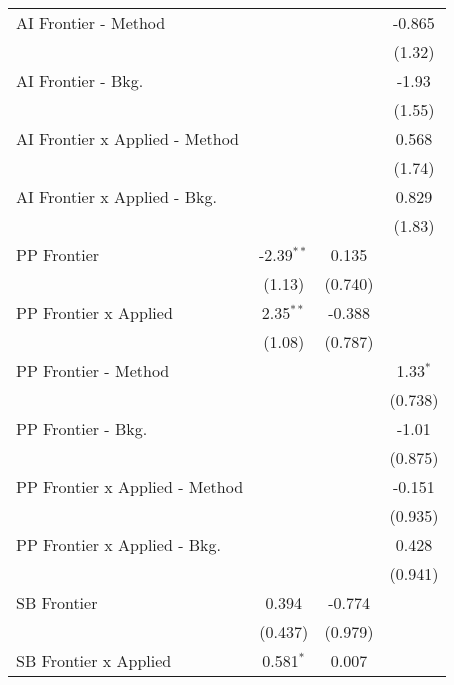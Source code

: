 \begin{tabular}{lccc}
   AI Frontier - Method           &              &             & -0.865\\   
                                  &              &             & (1.32)\\   
   AI Frontier - Bkg.             &              &             & -1.93\\   
                                  &              &             & (1.55)\\   
   AI Frontier x Applied - Method &              &             & 0.568\\   
                                  &              &             & (1.74)\\   
   AI Frontier x Applied - Bkg.   &              &             & 0.829\\   
                                  &              &             & (1.83)\\   
   PP Frontier                    & -2.39$^{**}$ & 0.135       &   \\   
                                  & (1.13)       & (0.740)     &   \\   
   PP Frontier x Applied          & 2.35$^{**}$  & -0.388      &   \\   
                                  & (1.08)       & (0.787)     &   \\   
   PP Frontier - Method           &              &             & 1.33$^{*}$\\   
                                  &              &             & (0.738)\\   
   PP Frontier - Bkg.             &              &             & -1.01\\   
                                  &              &             & (0.875)\\   
   PP Frontier x Applied - Method &              &             & -0.151\\   
                                  &              &             & (0.935)\\   
   PP Frontier x Applied - Bkg.   &              &             & 0.428\\   
                                  &              &             & (0.941)\\   
   SB Frontier                    & 0.394        & -0.774      &   \\   
                                  & (0.437)      & (0.979)     &   \\   
   SB Frontier x Applied          & 0.581$^{*}$  & 0.007       &   \\   

\end{tabular}
